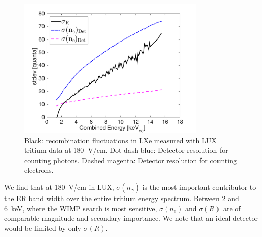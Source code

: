 \begin{figure}[h!]
\includegraphics[width=90mm]{fig/recomb_flucs.png}
\caption{Black: recombination fluctuations in LXe measured with LUX tritium data at 180~V/cm. Dot-dash blue: Detector resolution for counting photons. Dashed magenta: Detector resolution for counting electrons.}
\label{fig:recomb-flucs}
\end{figure}

We find that at 180~V/cm in LUX, $ \sigma(n_{\gamma})$ is the most important contributor to the ER band width over the entire tritium energy spectrum. Between 2 and 6~keV, where the WIMP search is most sensitive, $ \sigma(n_e)$ and $ \sigma(R)$ are of comparable magnitude and secondary importance. We note that an ideal detector would be limited by only $ \sigma(R)$.








